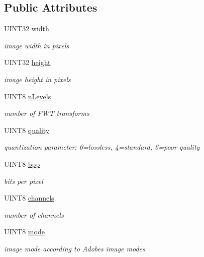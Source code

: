 \subsection*{Public Attributes}
\begin{DoxyCompactItemize}
\item 
U\+I\+N\+T32 \mbox{\hyperlink{structPGFHeader_a766a68c3284c2ae6d2f54c82e7350ed9}{width}}
\begin{DoxyCompactList}\small\item\em image width in pixels \end{DoxyCompactList}\item 
U\+I\+N\+T32 \mbox{\hyperlink{structPGFHeader_a7262335e99ca409759e1aa8c0f0164b1}{height}}
\begin{DoxyCompactList}\small\item\em image height in pixels \end{DoxyCompactList}\item 
U\+I\+N\+T8 \mbox{\hyperlink{structPGFHeader_a963890fa1e02a517923f9d0bf0d7e9eb}{n\+Levels}}
\begin{DoxyCompactList}\small\item\em number of F\+WT transforms \end{DoxyCompactList}\item 
U\+I\+N\+T8 \mbox{\hyperlink{structPGFHeader_ac314a16d5984aea88f4a5ff38f49c08b}{quality}}
\begin{DoxyCompactList}\small\item\em quantization parameter\+: 0=lossless, 4=standard, 6=poor quality \end{DoxyCompactList}\item 
U\+I\+N\+T8 \mbox{\hyperlink{structPGFHeader_aedea199e29cd6c404c82ab97c67e46b4}{bpp}}
\begin{DoxyCompactList}\small\item\em bits per pixel \end{DoxyCompactList}\item 
U\+I\+N\+T8 \mbox{\hyperlink{structPGFHeader_abda7a5f282421cd7e789da62f657efa0}{channels}}
\begin{DoxyCompactList}\small\item\em number of channels \end{DoxyCompactList}\item 
U\+I\+N\+T8 \mbox{\hyperlink{structPGFHeader_a3ddaf075db8ee812ad688d9ed39e0698}{mode}}
\begin{DoxyCompactList}\small\item\em image mode according to Adobe\textquotesingle{}s image modes \end{DoxyCompactList}\item 

\end{DoxyCompactItemize}
